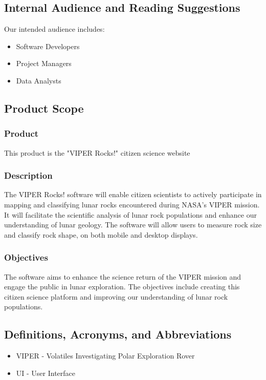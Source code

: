 \documentclass{article}
\begin{document}
\subsection{Internal Audience and Reading Suggestions}
Our intended audience includes: 
\begin{itemize}
	\item Software Developers
	\item Project Managers
	\item Data Analysts
\end{itemize}

\subsection{Product Scope}

\subsubsection{Product}
This product is the "VIPER Rocks!" citizen science website

\subsubsection{Description}
The VIPER Rocks! software will enable citizen scientists to actively participate in mapping and classifying lunar rocks encountered during NASA's VIPER mission. It will facilitate the scientific analysis of lunar rock populations and enhance our understanding of lunar geology. The software will allow users to measure rock size and classify rock shape, on both mobile and desktop displays.

\subsubsection{Objectives}
The software aims to enhance the science return of the VIPER mission and engage the public in lunar exploration. The objectives include creating this citizen science platform and improving our understanding of lunar rock populations.

\subsection{Definitions, Acronyms, and Abbreviations}
\begin{itemize}
	\item VIPER - Volatiles Investigating Polar Exploration Rover
	\item UI - User Interface
\end{itemize}
\end{document}
